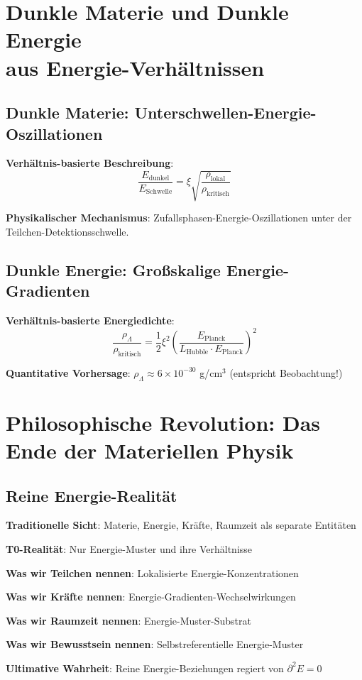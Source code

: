 \documentclass[12pt,a4paper]{article}
\newcommand{\Efield}{E}
\newcommand{\xipar}{\xi}
\theoremstyle{definition}
\theoremstyle{remark}
\begin{document}
	\section{Dunkle Materie und Dunkle Energie\\ aus Energie-Verhältnissen}
	
	\subsection{Dunkle Materie: Unterschwellen-Energie-Oszillationen}
	
	\textbf{Verhältnis-basierte Beschreibung}:
	\begin{equation}
		\frac{\Efield_{\text{dunkel}}}{\Efield_{\text{Schwelle}}} = \xipar \sqrt{\frac{\rho_{\text{lokal}}}{\rho_{\text{kritisch}}}}
	\end{equation}
	
	\textbf{Physikalischer Mechanismus}: Zufallsphasen-Energie-Oszillationen unter der Teilchen-Detektionsschwelle.
	
	\subsection{Dunkle Energie: Großskalige Energie-Gradienten}
	
	\textbf{Verhältnis-basierte Energiedichte}:
	\begin{equation}
		\frac{\rho_{\Lambda}}{\rho_{\text{kritisch}}} = \frac{1}{2} \xipar^2 \left(\frac{E_{\text{Planck}}}{L_{\text{Hubble}} \cdot E_{\text{Planck}}}\right)^2
	\end{equation}
	
	\textbf{Quantitative Vorhersage}: $\rho_{\Lambda} \approx 6 \times 10^{-30}$ g/cm$^3$ (entspricht Beobachtung!)
	
	\section{Philosophische Revolution: Das Ende der Materiellen Physik}
	
	\subsection{Reine Energie-Realität}
	
	\begin{tcolorbox}[colback=purple!5!white,colframe=purple!75!black,title=Die ultimative Entmaterialisierung]
		\textbf{Traditionelle Sicht}: Materie, Energie, Kräfte, Raumzeit als separate Entitäten
		
		\textbf{T0-Realität}: Nur Energie-Muster und ihre Verhältnisse
		
		\textbf{Was wir Teilchen nennen}: Lokalisierte Energie-Konzentrationen
		
		\textbf{Was wir Kräfte nennen}: Energie-Gradienten-Wechselwirkungen
		
		\textbf{Was wir Raumzeit nennen}: Energie-Muster-Substrat
		
		\textbf{Was wir Bewusstsein nennen}: Selbstreferentielle Energie-Muster
		
		\textbf{Ultimative Wahrheit}: Reine Energie-Beziehungen regiert von $\partial^2 \Efield = 0$
	\end{tcolorbox}
	
\end{document}
